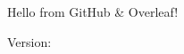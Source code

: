 \documentclass{article}
\begin{document}
Hello from GitHub \& Overleaf!   

Version: \buildversion
\end{document}
